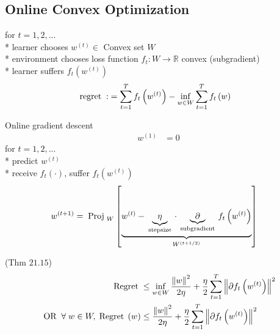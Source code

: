 \documentclass{article}
\begin{document}
\subsection{Online Convex Optimization}
for $t  = 1, 2, ...$
\\* learner chooses $w^{\left(t\right)} \in$ Convex set $W $
\\* environment chooses loss function $f_{t} : W \to  \mathbb{R}$ convex (subgradient)
\\* learner suffers $f_{t}\left(w^{\left(t\right)}\right)$
\newline \newline
\begin{align*}
\text{\;regret\;} :&= \displaystyle\sum_{t=1}^{T} f_{t}\left(w^{\left(t\right)}\right) - \displaystyle\inf_{w \in W} \displaystyle\sum_{t=1}^{T} f_{t}\left(w\right)
\end{align*}
\begin{figure}[H] \centering {} 
\end{figure}
Online gradient descent
\begin{align*}
w^{\left(1\right)} &= 0
\end{align*}
for $t  = 1, 2, ...$
\\* predict $w^{\left(t\right)}$
\\* receive $f_{t}\left(\cdot \right)$, suffer $f_{t}\left(w^{\left(t\right)}\right)$
\begin{align*}
w^{\left(t+1\right)} &= \text{\;Proj\;} _{W} \left[\underbrace{w^{\left(t\right)} - \underbrace{\eta}_{\text{\;stepsize\;}} \cdot  \underbrace{\partial}_{\text{\;subgradient\;}} f_{t}\left(w^{\left(t\right)}\right)}_{W^{\left(t + 1/2\right)}}\right]
\end{align*}
\begin{thm} \label{thm:t2115} 
(Thm $21.15$)
\begin{align*}
\text{\;Regret\;} &\leq  \displaystyle\inf_{w \in W} \dfrac{\left\|w\right\|^{2}}{2 \eta} + \dfrac{\eta}{2} \displaystyle\sum_{t=1}^{T} \left\|\partial f_{t}\left(w^{\left(t\right)}\right)\right\|^{2}
\\ \text{\;OR\;} \;\forall\; w \in W, \text{\;Regret\;} \left(w\right) &\leq  \dfrac{\left\|w\right\|^{2}}{2 \eta} + \dfrac{\eta}{2} \displaystyle\sum_{t=1}^{T} \left\|\partial f_{t}\left(w^{\left(t\right)}\right)\right\|^{2}
\end{align*}
\end{thm}
\end{document}
